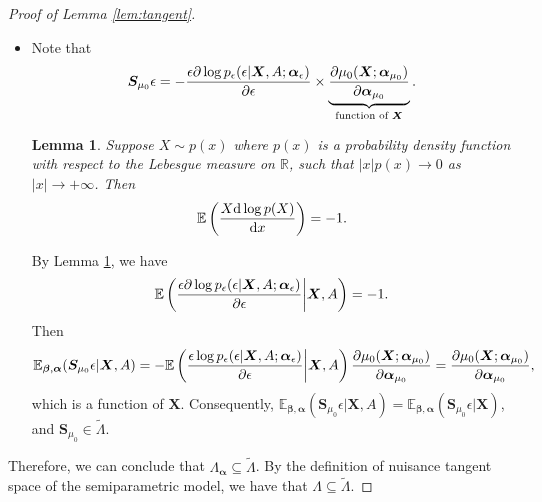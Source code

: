 \documentclass[11pt]{article}
\numberwithin{equation}{section}
\newtheorem{lem}{Lemma}[section]
\theoremstyle{definition}
\theoremstyle{remark}
\newcommand{\bS}{\bm{S}}
\newcommand{\bX}{\bm{X}}
\newcommand{\bbeta}{\bm{\beta}}
\newcommand{\balpha}{\bm{\alpha}}
\newcommand{\bbE}{\mathbb{E}}
\newcommand{\bbR}{\mathbb{R}}
\newcommand{\rd}{\mathrm{d}}
\begin{document}
\begin{proof}[Proof of Lemma \ref{lem:tangent}]
\begin{itemize}
		\item Note that
		\[ \bS_{\mu_{0}}\epsilon = - {\epsilon\partial \log p_{\epsilon}(\epsilon|\bX,A;\balpha_{\epsilon}) \over \partial\epsilon}\times\underbrace{\partial \mu_{0}(\bX;\balpha_{\mu_{0}}) \over \partial \balpha_{\mu_{0}}}_{\text{function of $ \bX $}}. \]
		
		\begin{lem}\label{lem:score}
			Suppose $ X \sim p(x) $ where $ p(x) $ is a probability density function with respect to the Lebesgue measure on $ \bbR $, such that $ |x|p(x) \to 0 $ as $ |x| \to +\infty $. Then
			\[  \bbE\left( {X \rd \log p(X) \over \rd x} \right) = -1. \]
		\end{lem}
	
		By Lemma \ref{lem:score}, we have
		\begin{align}
			\bbE\left( {\epsilon\partial\log p_{\epsilon}(\epsilon|\bX,A;\balpha_{\epsilon}) \over \partial \epsilon}\middle|\bX,A \right) = -1.\label{eq:tangent}
		\end{align}
		Then
		\[ \bbE_{\bbeta,\balpha}(\bS_{\mu_{0}}\epsilon|\bX,A) = - \bbE\left( {\epsilon\log p_{\epsilon}(\epsilon|\bX,A;\balpha_{\epsilon}) \over \partial \epsilon}\middle|\bX,A \right){\partial \mu_{0}(\bX;\balpha_{\mu_{0}}) \over \partial\balpha_{\mu_{0}}} = {\partial \mu_{0}(\bX;\balpha_{\mu_{0}}) \over \partial\balpha_{\mu_{0}}}, \]
		which is a function of $ \bX $. Consequently, $ \bbE_{\bbeta,\balpha}(\bS_{\mu_{0}}\epsilon|\bX,A) = \bbE_{\bbeta,\balpha}(\bS_{\mu_{0}}\epsilon|\bX) $, and $ \bS_{\mu_{0}} \in \widetilde{\Lambda} $.
	\end{itemize}
	Therefore, we can conclude that $ \Lambda_{\balpha} \subseteq \widetilde{\Lambda} $. By the definition of nuisance tangent space of the semiparametric model, we have that $ \Lambda \subseteq \widetilde{\Lambda} $.
	

\end{proof}
\end{document}

